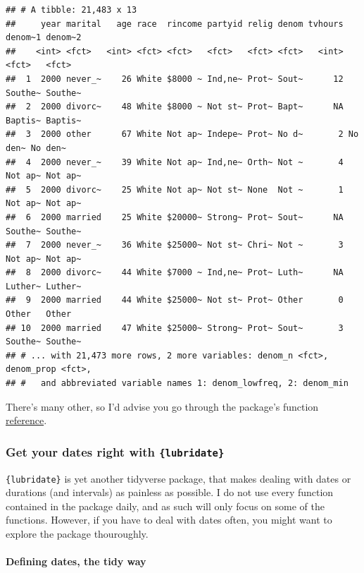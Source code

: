 \documentclass[
]{article}
\begin{document}
\begin{verbatim}
## # A tibble: 21,483 x 13
##     year marital   age race  rincome partyid relig denom tvhours denom~1 denom~2
##    <int> <fct>   <int> <fct> <fct>   <fct>   <fct> <fct>   <int> <fct>   <fct>  
##  1  2000 never_~    26 White $8000 ~ Ind,ne~ Prot~ Sout~      12 Southe~ Southe~
##  2  2000 divorc~    48 White $8000 ~ Not st~ Prot~ Bapt~      NA Baptis~ Baptis~
##  3  2000 other      67 White Not ap~ Indepe~ Prot~ No d~       2 No den~ No den~
##  4  2000 never_~    39 White Not ap~ Ind,ne~ Orth~ Not ~       4 Not ap~ Not ap~
##  5  2000 divorc~    25 White Not ap~ Not st~ None  Not ~       1 Not ap~ Not ap~
##  6  2000 married    25 White $20000~ Strong~ Prot~ Sout~      NA Southe~ Southe~
##  7  2000 never_~    36 White $25000~ Not st~ Chri~ Not ~       3 Not ap~ Not ap~
##  8  2000 divorc~    44 White $7000 ~ Ind,ne~ Prot~ Luth~      NA Luther~ Luther~
##  9  2000 married    44 White $25000~ Not st~ Prot~ Other       0 Other   Other  
## 10  2000 married    47 White $25000~ Strong~ Prot~ Sout~       3 Southe~ Southe~
## # ... with 21,473 more rows, 2 more variables: denom_n <fct>, denom_prop <fct>,
## #   and abbreviated variable names 1: denom_lowfreq, 2: denom_min
\end{verbatim}

There's many other, so I'd advise you go through the package's function \href{https://forcats.tidyverse.org/reference/index.html}{reference}.

\hypertarget{get-your-dates-right-with-lubridate}{%
\subsubsection{\texorpdfstring{Get your dates right with \texttt{\{lubridate\}}}{Get your dates right with \{lubridate\}}}\label{get-your-dates-right-with-lubridate}}

\texttt{\{lubridate\}} is yet another tidyverse package, that makes dealing with dates or durations (and intervals) as
painless as possible. I do not use every function contained in the package daily, and as such will
only focus on some of the functions. However, if you have to deal with dates often,
you might want to explore the package thouroughly.

\hypertarget{defining-dates-the-tidy-way}{%
\paragraph{Defining dates, the tidy way}\label{defining-dates-the-tidy-way}}
\end{document}

